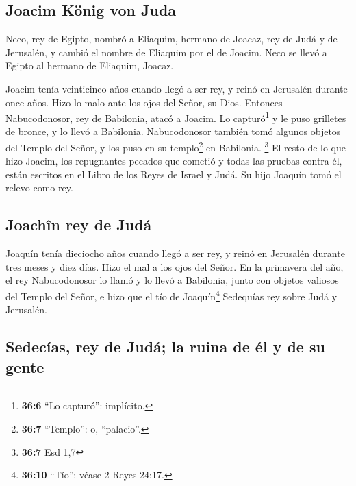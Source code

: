 \hypertarget{joacim-kuxf6nig-von-juda}{%
\subsection{Joacim König von Juda}\label{joacim-kuxf6nig-von-juda}}

 Neco, rey de Egipto, nombró a Eliaquim, hermano de
Joacaz, rey de Judá y de Jerusalén, y cambió el nombre de Eliaquim por
el de Joacim. Neco se llevó a Egipto al hermano de Eliaquim, Joacaz.

 Joacim tenía veinticinco años cuando llegó a ser rey, y
reinó en Jerusalén durante once años. Hizo lo malo ante los ojos del
Señor, su Dios.  Entonces Nabucodonosor, rey de Babilonia,
atacó a Joacim. Lo capturó\footnote{\textbf{36:6} ``Lo capturó'':
  implícito.} y le puso grilletes de bronce, y lo llevó a Babilonia.
 Nabucodonosor también tomó algunos objetos del Templo del
Señor, y los puso en su templo\footnote{\textbf{36:7} ``Templo'': o,
  ``palacio''.} en Babilonia. \footnote{\textbf{36:7} Esd 1,7}
 El resto de lo que hizo Joacim, los repugnantes pecados
que cometió y todas las pruebas contra él, están escritos en el Libro de
los Reyes de Israel y Judá. Su hijo Joaquín tomó el relevo como rey.

\hypertarget{joachuxeen-rey-de-juduxe1}{%
\subsection{Joachîn rey de Judá}\label{joachuxeen-rey-de-juduxe1}}

 Joaquín tenía dieciocho años cuando llegó a ser rey, y
reinó en Jerusalén durante tres meses y diez días. Hizo el mal a los
ojos del Señor.  En la primavera del año, el rey
Nabucodonosor lo llamó y lo llevó a Babilonia, junto con objetos
valiosos del Templo del Señor, e hizo que el tío de Joaquín\footnote{\textbf{36:10}
  ``Tío'': véase 2 Reyes 24:17.} Sedequías rey sobre Judá y Jerusalén.

\hypertarget{sedecuxedas-rey-de-juduxe1-la-ruina-de-uxe9l-y-de-su-gente}{%
\subsection{Sedecías, rey de Judá; la ruina de él y de su
gente}\label{sedecuxedas-rey-de-juduxe1-la-ruina-de-uxe9l-y-de-su-gente}}

